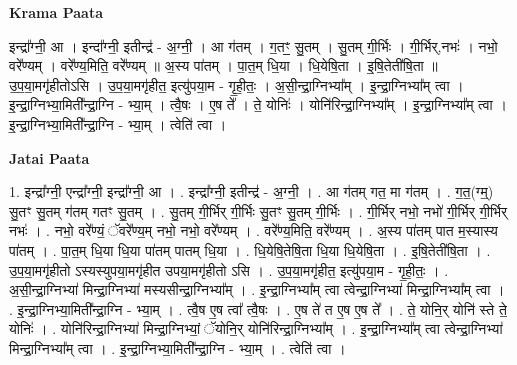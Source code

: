 \documentclass[17pt]{extarticle}
\begin{document}
\textbf{Krama Paata} \newline

इन्द्रा᳚ग्नी॒ आ । इन्दा᳚ग्नी॒ इतीन्द्र॑ - अ॒ग्नी॒ । आ ग॑तम् । ग॒तꣳ॒॒ सु॒तम् । सु॒तम् गी॒र्भिः । गी॒र्भिर्,नभः॑ । नभो॒ वरे᳚ण्यम् । वरे᳚ण्य॒मिति॒ वरे᳚ण्यम् ॥ अ॒स्य पा॑तम् । पा॒त॒म् धि॒या । धि॒येषि॒ता । इ॒षि॒तेती॑षि॒ता ॥ उ॒प॒या॒मगृ॑हीतोऽसि । उ॒प॒या॒मगृ॑हीत॒ इत्यु॑पया॒म - गृ॒ही॒तः॒ । अ॒सी॒न्द्रा॒ग्निभ्या᳚म् । इ॒न्द्रा॒ग्निभ्या᳚म् त्वा । इ॒न्द्रा॒ग्निभ्या॒मिती᳚न्द्रा॒ग्नि - भ्या॒म् । त्वै॒षः । ए॒ष ते᳚ । ते॒ योनिः॑ । योनि॑रिन्द्रा॒ग्निभ्या᳚म् । इ॒न्द्रा॒ग्निभ्या᳚म् त्वा । इ॒न्द्रा॒ग्निभ्या॒मिती᳚न्द्रा॒ग्नि - भ्या॒म् । त्वेति॑ त्वा । \newline

\textbf{Jatai Paata} \newline

1. इन्द्रा᳚ग्नी॒ एन्द्रा᳚ग्नी॒ इन्द्रा᳚ग्नी॒ आ । . इन्द्रा᳚ग्नी॒ इतीन्द्र॑ - अ॒ग्नी॒ । . आ ग॑तम् गत॒ मा ग॑तम् । . ग॒त॒(ग्म्॒) सु॒तꣳ सु॒तम् ग॑तम् गतꣳ सु॒तम् । . सु॒तम् गी॒र्भिर् गी॒र्भिः सु॒तꣳ सु॒तम् गी॒र्भिः । . गी॒र्भिर् नभो॒ नभो॑ गी॒र्भिर् गी॒र्भिर् नभः॑ । . नभो॒ वरे᳚ण्यं॒ ॅवरे᳚ण्य॒म् नभो॒ नभो॒ वरे᳚ण्यम् । . वरे᳚ण्य॒मिति॒ वरे᳚ण्यम् । . अ॒स्य पा॑तम् पात म॒स्यास्य पा॑तम् । . पा॒त॒म् धि॒या धि॒या पा॑तम् पातम् धि॒या । . धि॒येषि॒तेषि॒ता धि॒या धि॒येषि॒ता । . इ॒षि॒तेती॑षि॒ता । . उ॒प॒या॒मगृ॑हीतो ऽस्यस्युपया॒मगृ॑हीत उपया॒मगृ॑हीतो ऽसि । . उ॒प॒या॒मगृ॑हीत॒ इत्यु॑पया॒म - गृ॒ही॒तः॒ । . अ॒सी॒न्द्रा॒ग्निभ्या॑ मिन्द्रा॒ग्निभ्या॑ मस्यसीन्द्रा॒ग्निभ्या᳚म् । . इ॒न्द्रा॒ग्निभ्या᳚म् त्वा त्वेन्द्रा॒ग्निभ्या॑ मिन्द्रा॒ग्निभ्या᳚म् त्वा । . इ॒न्द्रा॒ग्निभ्या॒मिती᳚न्द्रा॒ग्नि - भ्या॒म् । . त्वै॒ष ए॒ष त्वा᳚ त्वै॒षः । . ए॒ष ते॑ त ए॒ष ए॒ष ते᳚ । . ते॒ योनि॒र् योनि॑ स्ते ते॒ योनिः॑ । . योनि॑रिन्द्रा॒ग्निभ्या॑ मिन्द्रा॒ग्निभ्यां॒ ॅयोनि॒र् योनि॑रिन्द्रा॒ग्निभ्या᳚म् । . इ॒न्द्रा॒ग्निभ्या᳚म् त्वा त्वेन्द्रा॒ग्निभ्या॑ मिन्द्रा॒ग्निभ्या᳚म् त्वा । . इ॒न्द्रा॒ग्निभ्या॒मिती᳚न्द्रा॒ग्नि - भ्या॒म् । . त्वेति॑ त्वा । \newline
\end{document}
